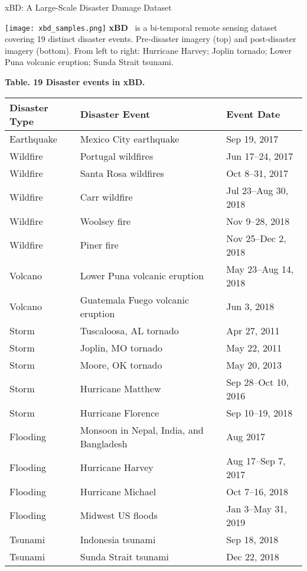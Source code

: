 \begin{refsection}
  \begin{frame}{xBD: A Large-Scale Disaster Damage Dataset}
    \begin{minipage}{0.42\linewidth}
      \centering
      \texttt{[image: xbd\_samples.png]}
      \vspace{0.5em}
      \scriptsize
      \textbf{xBD}~\parencite{guptaCreatingXBDDataset2019} is a bi-temporal remote sensing dataset covering 19 distinct disaster events. Pre-disaster imagery (top) and post-disaster imagery (bottom). From left to right: Hurricane Harvey; Joplin tornado; Lower Puna volcanic eruption; Sunda Strait tsunami.
    \end{minipage}%
    \hfill
    \begin{minipage}{0.55\linewidth}
      \tiny
      \centering
      \textbf{Table. 19 Disaster events in xBD.}
      \begin{tabular}{lll}
        \hline
        \textbf{Disaster Type} & \textbf{Disaster Event} & \textbf{Event Date} \\
        \hline
        Earthquake & Mexico City earthquake & Sep 19, 2017 \\
        Wildfire & Portugal wildfires & Jun 17--24, 2017 \\
        Wildfire & Santa Rosa wildfires & Oct 8--31, 2017 \\
        Wildfire & Carr wildfire & Jul 23--Aug 30, 2018 \\
        Wildfire & Woolsey fire & Nov 9--28, 2018 \\
        Wildfire & Piner fire & Nov 25--Dec 2, 2018 \\
        Volcano & Lower Puna volcanic eruption & May 23--Aug 14, 2018 \\
        Volcano & Guatemala Fuego volcanic eruption & Jun 3, 2018 \\
        Storm & Tuscaloosa, AL tornado & Apr 27, 2011 \\
        Storm & Joplin, MO tornado & May 22, 2011 \\
        Storm & Moore, OK tornado & May 20, 2013 \\
        Storm & Hurricane Matthew & Sep 28--Oct 10, 2016 \\
        Storm & Hurricane Florence & Sep 10--19, 2018 \\
        Flooding & Monsoon in Nepal, India, and Bangladesh & Aug 2017 \\
        Flooding & Hurricane Harvey & Aug 17--Sep 7, 2017 \\
        Flooding & Hurricane Michael & Oct 7--16, 2018 \\
        Flooding & Midwest US floods & Jan 3--May 31, 2019 \\
        Tsunami & Indonesia tsunami & Sep 18, 2018 \\
        Tsunami & Sunda Strait tsunami & Dec 22, 2018 \\
        \hline
      \end{tabular}
      \vspace{0.5em}


\end{minipage}
\end{frame}
\end{refsection}
